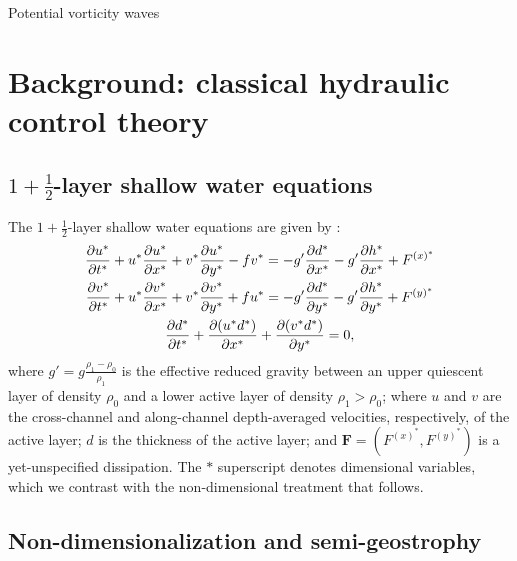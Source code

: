 \documentclass{jfm}
\begin{document}
Potential vorticity waves

\section{Background: classical hydraulic control theory}

\subsection{$1+\frac{1}{2}$-layer shallow water equations}

The $1+\frac{1}{2}$-layer shallow water equations are given by \citep{Pratt2007}:
\begin{gather}
    \pdv{u^*}{t^*} + u^* \pdv{u^*}{x^*} + v^* \pdv{u^*}{y^*} - f v^* = - g' \pdv{d^*}{x^*} - g' \pdv{h^*}{x^*} + F^{(x)^*}\label{eq.x-mom} \\
    \pdv{v^*}{t^*} + u^* \pdv{v^*}{x^*} + v^* \pdv{v^*}{y^*} + f u^* = - g'\pdv{d^*}{y^*} - g'\pdv{h^*}{y^*} + F^{(y)^*}\label{eq.y-mom}  \\
    \pdv{d^*}{t^*} + \pdv{(u^* d^*)}{x^*} + \pdv{(v^* d^*)}{y^*} = 0,\label{eq.mass} 
\end{gather}
where $g'=g\frac{\rho_{1} - \rho_{0}}{\rho_{1}}$ is the effective reduced gravity between an upper quiescent layer of density $\rho_{0}$ and a lower active layer of density $\rho_{1}>\rho_{0}$; where $u$ and $v$ are the cross-channel and along-channel depth-averaged velocities, respectively, of the active layer; $d$ is the thickness of the active layer; and $\mathbf{F} = (F^{(x)^*}, F^{(y)^*})$ is a yet-unspecified dissipation. The $*$ superscript denotes dimensional variables, which we contrast with the non-dimensional treatment that follows.

\subsection{Non-dimensionalization and semi-geostrophy}
\end{document}
